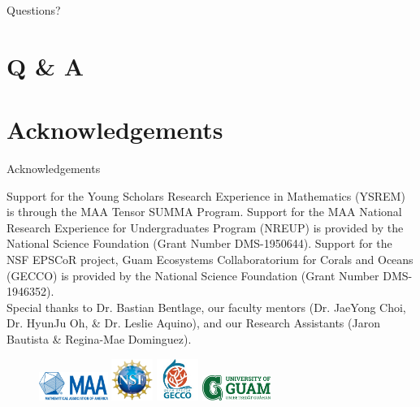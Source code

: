 \documentclass{beamer}
\begin{document}
\begin{frame}
    \Huge{Questions?}
\end{frame}

\section{Q \& A}


\section{Acknowledgements}
\begin{frame}{Acknowledgements}
    \begin{center}
        Support for the Young Scholars Research Experience in Mathematics (YSREM)  is through the MAA Tensor SUMMA Program. Support for the MAA National Research Experience for Undergraduates Program (NREUP) is provided by the National Science Foundation (Grant Number DMS-1950644). Support for the NSF EPSCoR project, Guam Ecosystems Collaboratorium for Corals and Oceans (GECCO) is provided by the National Science Foundation (Grant Number DMS-1946352). \\
    \vspace{.2cm}
    \small{Special thanks to Dr. Bastian Bentlage, our faculty mentors (Dr. JaeYong Choi, Dr. HyunJu Oh, \& Dr. Leslie Aquino), and our Research Assistants (Jaron Bautista \& Regina-Mae Dominguez).}
    
    \begin{figure}
        \includegraphics[width = 0.20\textwidth]{Figures/MAA_logo_PMS286.jpg}
        \label{MAA}
        \includegraphics[width = 0.12\textwidth]{Figures/NSF_4-Color_bitmap_Logo.png}
        \label{NSF}
        \includegraphics[width = 0.12\textwidth]{Figures/epscor.jpeg}
        \label{epscor}
        \includegraphics[width = 0.20\textwidth]{Figures/UOG-horizontal.png}
        \label{uog}
    \end{figure}
    \end{center}
\end{frame}
\end{document}
